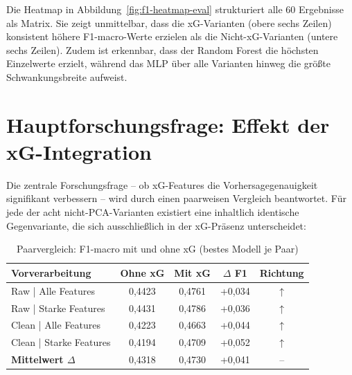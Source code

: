 Die Heatmap in Abbildung~\ref{fig:f1-heatmap-eval} strukturiert alle 60 Ergebnisse
als Matrix. Sie zeigt unmittelbar, dass die xG-Varianten (obere sechs Zeilen)
konsistent höhere F1-macro-Werte erzielen als die Nicht-xG-Varianten (untere
sechs Zeilen). Zudem ist erkennbar, dass der Random Forest die höchsten
Einzelwerte erzielt, während das MLP über alle Varianten hinweg die
größte Schwankungsbreite aufweist.

\section{Hauptforschungsfrage: Effekt der xG-Integration}
\label{sec:eval-xg}

Die zentrale Forschungsfrage -- ob xG-Features die Vorhersagegenauigkeit
signifikant verbessern -- wird durch einen paarweisen Vergleich beantwortet.
Für jede der acht nicht-PCA-Varianten existiert eine inhaltlich identische
Gegenvariante, die sich ausschließlich in der xG-Präsenz unterscheidet:

\begin{table}[h]
    \centering
    \caption{Paarvergleich: F1-macro mit und ohne xG (bestes Modell je Paar)}
    \label{tab:paarvergleich-xg}
    \begin{tabular}{l c c c c}
        \toprule
        \textbf{Vorverarbeitung} &
        \textbf{Ohne xG} & \textbf{Mit xG} &
        \textbf{$\Delta$ F1} & \textbf{Richtung} \\
        \midrule
        Raw | Alle Features     & 0,4423 & 0,4761 & +0,034 & $\uparrow$ \\
        Raw | Starke Features   & 0,4431 & 0,4786 & +0,036 & $\uparrow$ \\
        Clean | Alle Features   & 0,4223 & 0,4663 & +0,044 & $\uparrow$ \\
        Clean | Starke Features & 0,4194 & 0,4709 & +0,052 & $\uparrow$ \\
        \midrule
        \textbf{Mittelwert $\Delta$} & 0,4318 & 0,4730 & +0,041 & -- \\
        \bottomrule
    \end{tabular}
\end{table}

